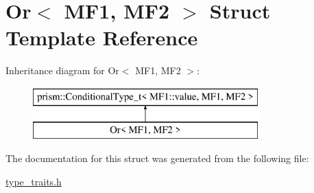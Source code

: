 \hypertarget{struct_or_3_01_m_f1_00_01_m_f2_01_4}{}\section{Or$<$ M\+F1, M\+F2 $>$ Struct Template Reference}
\label{struct_or_3_01_m_f1_00_01_m_f2_01_4}
Inheritance diagram for Or$<$ M\+F1, M\+F2 $>$\+:\begin{figure}[H]
\begin{center}
\leavevmode
\includegraphics[height=2.000000cm]{struct_or_3_01_m_f1_00_01_m_f2_01_4}
\end{center}
\end{figure}


The documentation for this struct was generated from the following file\+:\begin{DoxyCompactItemize}
\item 
\hyperlink{type__traits_8h}{type\+\_\+traits.\+h}\end{DoxyCompactItemize}
